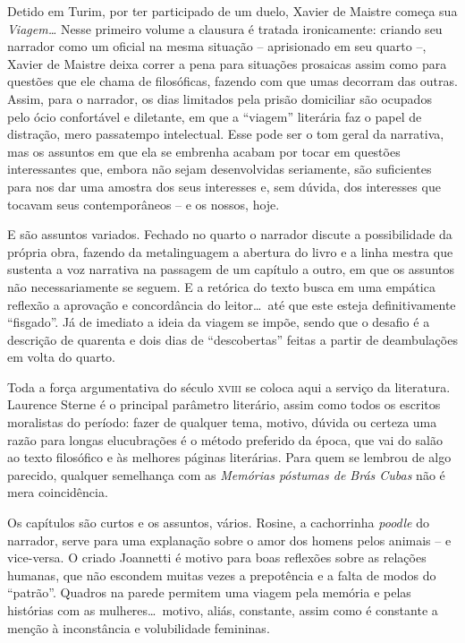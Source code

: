 Detido em Turim, por ter participado de um duelo, Xavier de Maistre
começa sua \textit{Viagem\ldots} Nesse primeiro volume a clausura é
tratada ironicamente: criando seu narrador como um oficial na mesma
situação -- aprisionado em seu quarto --, Xavier de Maistre deixa
correr a pena para situações prosaicas assim como para questões que ele
chama de filosóficas, fazendo com que umas decorram das outras. Assim,
para o narrador, os dias limitados pela prisão domiciliar são ocupados
pelo ócio confortável e diletante, em que a ``viagem'' literária faz o
papel de distração, mero passatempo intelectual. Esse pode ser o tom
geral da narrativa, mas os assuntos em que ela se embrenha acabam por
tocar em questões interessantes que, embora não sejam desenvolvidas
seriamente, são suficientes para nos dar uma amostra dos seus
interesses e, sem dúvida, dos interesses que tocavam seus
contemporâneos -- e os nossos, hoje. 

E são assuntos variados. Fechado no quarto o narrador discute a
possibilidade da própria obra, fazendo da metalinguagem a abertura do
livro e a linha mestra que sustenta a voz narrativa na passagem de um
capítulo a outro, em que os assuntos não necessariamente se seguem. E a
retórica do texto busca em uma empática reflexão a aprovação e
concordância do leitor\ldots\ até que este esteja definitivamente
``fisgado''. Já de imediato a ideia da viagem se impõe, sendo que o
desafio é a descrição de quarenta e dois dias de ``descobertas'' feitas a
partir de deambulações em volta do quarto. 

Toda a força argumentativa do século \textsc{xviii} se coloca aqui a serviço da
literatura. Laurence Sterne é o principal parâmetro literário, assim
como todos os escritos moralistas do período: fazer de qualquer tema,
motivo, dúvida ou certeza uma razão para longas elucubrações é o método
preferido da época, que vai do salão ao texto filosófico e às melhores
páginas literárias. Para quem se lembrou de algo parecido, qualquer
semelhança com as \textit{Memórias póstumas de Brás Cubas} não é mera
coincidência.

Os capítulos são curtos e os assuntos, vários. Rosine, a cachorrinha
\textit{poodle} do narrador, serve para uma explanação sobre o amor dos homens
pelos animais -- e vice-versa. O criado Joannetti é motivo para boas
reflexões sobre as relações humanas, que não escondem muitas vezes a
prepotência e a falta de modos do ``patrão''. Quadros na parede permitem
uma viagem pela memória e pelas histórias com as mulheres\ldots\ motivo,
aliás, constante, assim como é constante a menção à inconstância e volubilidade femininas. 

